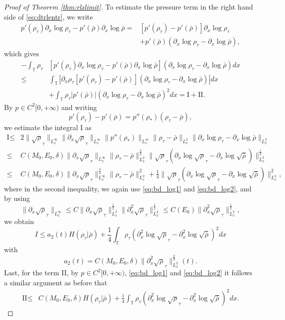\documentclass[leqno]{amsart}
\theoremstyle{plain}
\theoremstyle{definition}
\theoremstyle{remark}
\theoremstyle{plain}
\theoremstyle{plain}
\def\T{{\mathbb T}}%
\def\d{{\partial}}
\numberwithin{equation}{section}
\begin{document}
\begin{proof}[Proof of Theorem \ref{thm:rlxlimit}]
To estimate the pressure term in the right hand side of \eqref{eq:dtrlentr}, we write
\begin{align*}
p'(\rho_\tau)\d_x\log\rho_\tau-p'(\bar\rho)\d_x\log\bar\rho=&[p'(\rho_\tau)-p'(\bar\rho)]\d_x\log\rho_\tau\\
&+p'(\bar\rho)(\d_x\log\rho_\tau-\d_x\log\bar\rho),
\end{align*}
which gives
\begin{align*}
-\int_\T \rho_\tau&[p'(\rho_\tau)\d_x\log\rho_\tau-p'(\bar\rho)\d_x\log\bar\rho](\d_x\log\rho_\tau-\d_x\log\bar\rho) dx\\
\leq & \int_\T |\d_x\rho_\tau[p'(\rho_\tau)-p'(\bar\rho)](\d_x\log\rho_\tau-\d_x\log\bar\rho) |dx\\
&+\int_\T\rho_\tau|p'(\bar\rho)|(\d_x\log\rho_\tau-\d_x\log\bar\rho)^2dx=\textrm{I}+\textrm{II}.
\end{align*}
By $p\in C^2[0,+\infty)$ and writing 
\[
p'(\rho_\tau)-p'(\bar\rho)=p''(\rho_*)(\rho_\tau-\bar\rho),
\]
we estimate the integral I as
\begin{align*}
\textrm{I}\leq & 2\|\sqrt\rho_\tau\|_{L^\infty_x}\|\d_x\sqrt\rho_\tau\|_{L^\infty_x}\|p''(\rho_*)\|_{L^\infty_x}\|\rho_\tau-\bar\rho\|_{L^2_x}\|\d_x\log\rho_\tau-\d_x\log\bar\rho\|_{L^2_x}\\
\leq & C(M_0,E_0,\delta)\|\d_x\sqrt\rho_\tau\|_{L^\infty_x}\|\rho_\tau-\bar\rho\|_{L^2_x}^\frac32\|\sqrt\rho_\tau(\d_x\log\sqrt\rho_\tau-\d_x\log\sqrt{\bar\rho})\|_{L^2_x}^\frac12\\
\leq & C(M_0,E_0,\delta)\|\d_x\sqrt\rho_\tau\|_{L^\infty_x}^\frac43\|\rho_\tau-\bar\rho\|_{L^2_x}^2+\frac14\|\sqrt\rho_\tau(\d_x\log\sqrt\rho_\tau-\d_x\log\sqrt{\bar\rho})\|_{L^2_x}^2,
\end{align*}
where in the second inequality, we again use \eqref{eq:bd_log1} and \eqref{eq:bd_log2}, and by using
\[
\|\d_x\sqrt\rho_\tau\|_{L^\infty_x}\leq C\|\d_x\sqrt\rho_\tau\|_{L^2_x}^\frac12\|\d_x^2\sqrt\rho_\tau\|_{L^2_x}^\frac12\leq C(E_0)\|\d_x^2\sqrt\rho_\tau\|_{L^2_x}^\frac12,
\]
we obtain
\[
I\leq a_2(t)H(\rho_\tau|\bar\rho)+\frac14\int_\T\rho_\tau(\d_x^2\log\sqrt\rho_\tau-\d_x^2\log\sqrt{\bar\rho})^2 dx
\]
with 
\[
a_2(t)=C(M_0,E_0,\delta)\|\d_x^2\sqrt\rho_\tau\|_{L^2_x}^\frac23(t).
\]
Last, for the term \textrm{II}, by $p\in C^2[0,+\infty)$, \eqref{eq:bd_log1} and \eqref{eq:bd_log2} it follows a similar argument as before that
\begin{align*}
\textrm{II}\leq & C(M_0,E_0,\delta)H(\rho_\tau|\bar\rho)+\frac14\int_\T\rho_\tau(\d_x^2\log\sqrt\rho_\tau-\d_x^2\log\sqrt{\bar\rho})^2 dx.

\end{align*}
\end{proof}
\end{document}
